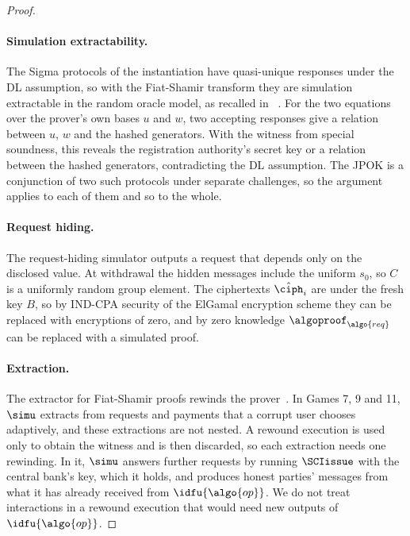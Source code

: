 \begin{proof}
\paragraph{Simulation extractability.} The Sigma protocols of the instantiation
have quasi-unique responses under the DL assumption, so with the Fiat-Shamir
transform they are simulation extractable in the random oracle model, as
recalled in ~\cite{INDOCRYPT:FKMV12}. For the two
equations over the prover's own bases $u$ and $w$, two accepting responses give
a relation between $u$, $w$ and the hashed generators. With the witness from
special soundness, this reveals the registration authority's secret key or a
relation between the hashed generators, contradicting the DL assumption. The
JPOK is a conjunction of two such protocols under separate challenges, so the
argument applies to each of them and so to the whole.

\paragraph{Request hiding.} The request-hiding simulator outputs a request that
depends only on the disclosed value. At withdrawal the hidden messages include
the uniform $s_0$, so $C$ is a uniformly random group element. The ciphertexts
$\hat{\ciph}_i$ are under the fresh key $B$, so by IND-CPA security of the
ElGamal encryption scheme they can be replaced with encryptions of zero, and by
zero knowledge $\algoproof_{\algo{req}}$ can be replaced with a simulated proof.

\paragraph{Extraction.} The extractor for Fiat-Shamir proofs rewinds the
prover~\cite{INDOCRYPT:FKMV12}. In Games 7, 9 and 11, $\simu$ extracts from
requests and payments that a corrupt user chooses adaptively, and these
extractions are not nested. A rewound execution is used only to obtain the
witness and is then discarded, so each extraction needs one rewinding. In it,
$\simu$ answers further requests by running $\SCIissue$ with the central bank's
key, which it holds, and produces honest parties' messages from what it has
already received from $\idfu{\algo{op}}$. We do not treat interactions in a
rewound execution that would need new outputs of $\idfu{\algo{op}}$.


\end{proof}
